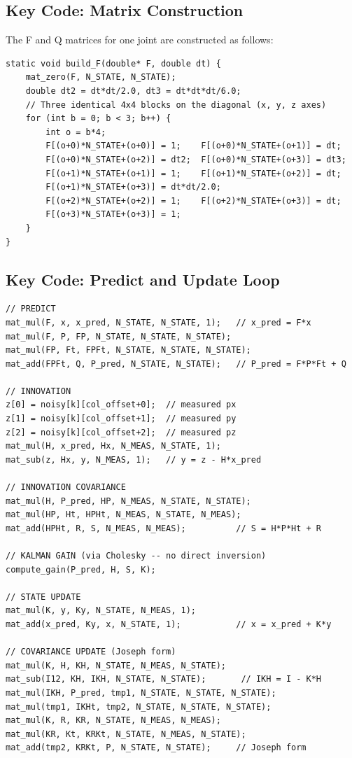 \documentclass[12pt,a4paper]{article}
\begin{document}
\subsection{Key Code: Matrix Construction}
The F and Q matrices for one joint are constructed as follows:
\begin{lstlisting}[caption={Building the state transition matrix F}]
static void build_F(double* F, double dt) {
    mat_zero(F, N_STATE, N_STATE);
    double dt2 = dt*dt/2.0, dt3 = dt*dt*dt/6.0;
    // Three identical 4x4 blocks on the diagonal (x, y, z axes)
    for (int b = 0; b < 3; b++) {
        int o = b*4;
        F[(o+0)*N_STATE+(o+0)] = 1;    F[(o+0)*N_STATE+(o+1)] = dt;
        F[(o+0)*N_STATE+(o+2)] = dt2;  F[(o+0)*N_STATE+(o+3)] = dt3;
        F[(o+1)*N_STATE+(o+1)] = 1;    F[(o+1)*N_STATE+(o+2)] = dt;
        F[(o+1)*N_STATE+(o+3)] = dt*dt/2.0;
        F[(o+2)*N_STATE+(o+2)] = 1;    F[(o+2)*N_STATE+(o+3)] = dt;
        F[(o+3)*N_STATE+(o+3)] = 1;
    }
}
\end{lstlisting}

\subsection{Key Code: Predict and Update Loop}
\begin{lstlisting}[caption={Core LKF predict--update step (per joint, per frame)}]
// PREDICT
mat_mul(F, x, x_pred, N_STATE, N_STATE, 1);   // x_pred = F*x
mat_mul(F, P, FP, N_STATE, N_STATE, N_STATE);
mat_mul(FP, Ft, FPFt, N_STATE, N_STATE, N_STATE);
mat_add(FPFt, Q, P_pred, N_STATE, N_STATE);   // P_pred = F*P*Ft + Q

// INNOVATION
z[0] = noisy[k][col_offset+0];  // measured px
z[1] = noisy[k][col_offset+1];  // measured py
z[2] = noisy[k][col_offset+2];  // measured pz
mat_mul(H, x_pred, Hx, N_MEAS, N_STATE, 1);
mat_sub(z, Hx, y, N_MEAS, 1);   // y = z - H*x_pred

// INNOVATION COVARIANCE
mat_mul(H, P_pred, HP, N_MEAS, N_STATE, N_STATE);
mat_mul(HP, Ht, HPHt, N_MEAS, N_STATE, N_MEAS);
mat_add(HPHt, R, S, N_MEAS, N_MEAS);          // S = H*P*Ht + R

// KALMAN GAIN (via Cholesky -- no direct inversion)
compute_gain(P_pred, H, S, K);

// STATE UPDATE
mat_mul(K, y, Ky, N_STATE, N_MEAS, 1);
mat_add(x_pred, Ky, x, N_STATE, 1);           // x = x_pred + K*y

// COVARIANCE UPDATE (Joseph form)
mat_mul(K, H, KH, N_STATE, N_MEAS, N_STATE);
mat_sub(I12, KH, IKH, N_STATE, N_STATE);       // IKH = I - K*H
mat_mul(IKH, P_pred, tmp1, N_STATE, N_STATE, N_STATE);
mat_mul(tmp1, IKHt, tmp2, N_STATE, N_STATE, N_STATE);
mat_mul(K, R, KR, N_STATE, N_MEAS, N_MEAS);
mat_mul(KR, Kt, KRKt, N_STATE, N_MEAS, N_STATE);
mat_add(tmp2, KRKt, P, N_STATE, N_STATE);     // Joseph form
\end{lstlisting}
\end{document}
